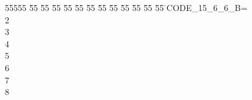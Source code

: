 %
%
\begin{tabbing}
55555 \= 55 \= 55 \= 55 \= 55 \= 55 \= 55 \= 55 \= 55 \= 55 \= 55 \= 55 \= 55 \= \>CODE\_15\_6\_6\_B=\\[0pt]
2\ \\[0pt]
3\ \\[0pt]
4\ \\[0pt]
5\ \\[0pt]
6\ \\[0pt]
7\\[0pt]
8\>\end{tabbing}
